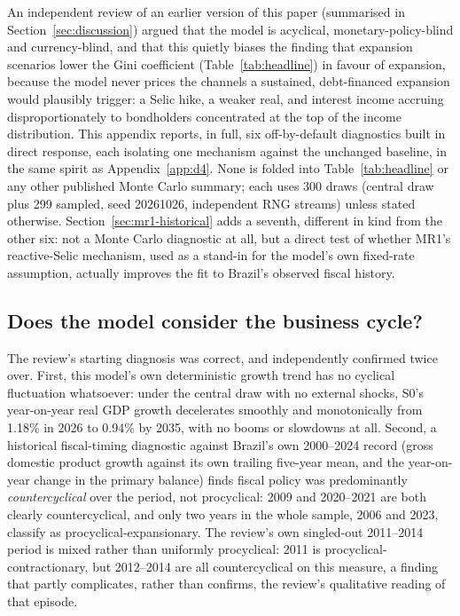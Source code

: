 \documentclass[11pt,a4paper]{article}
\begin{document}
\noindent An independent review of an earlier version of this paper (summarised in Section~\ref{sec:discussion}) argued that the model is acyclical, monetary-policy-blind and currency-blind, and that this quietly biases the finding that expansion scenarios lower the Gini coefficient (Table~\ref{tab:headline}) in favour of expansion, because the model never prices the channels a sustained, debt-financed expansion would plausibly trigger: a Selic hike, a weaker real, and interest income accruing disproportionately to bondholders concentrated at the top of the income distribution. This appendix reports, in full, six off-by-default diagnostics built in direct response, each isolating one mechanism against the unchanged baseline, in the same spirit as Appendix~\ref{app:d4}. None is folded into Table~\ref{tab:headline} or any other published Monte Carlo summary; each uses 300 draws (central draw plus 299 sampled, seed 20261026, independent RNG streams) unless stated otherwise. Section~\ref{sec:mr1-historical} adds a seventh, different in kind from the other six: not a Monte Carlo diagnostic at all, but a direct test of whether MR1's reactive-Selic mechanism, used as a stand-in for the model's own fixed-rate assumption, actually improves the fit to Brazil's observed fiscal history.

\subsection{Does the model consider the business cycle?}

The review's starting diagnosis was correct, and independently confirmed twice over. First, this model's own deterministic growth trend has no cyclical fluctuation whatsoever: under the central draw with no external shocks, \textsc{S0}'s year-on-year real GDP growth decelerates smoothly and monotonically from 1.18\% in 2026 to 0.94\% by 2035, with no booms or slowdowns at all. Second, a historical fiscal-timing diagnostic against Brazil's own 2000--2024 record (gross domestic product growth against its own trailing five-year mean, and the year-on-year change in the primary balance) finds fiscal policy was predominantly \emph{countercyclical} over the period, not procyclical: 2009 and 2020--2021 are both clearly countercyclical, and only two years in the whole sample, 2006 and 2023, classify as procyclical-expansionary. The review's own singled-out 2011--2014 period is mixed rather than uniformly procyclical: 2011 is procyclical-contractionary, but 2012--2014 are all countercyclical on this measure, a finding that partly complicates, rather than confirms, the review's qualitative reading of that episode.
\end{document}
